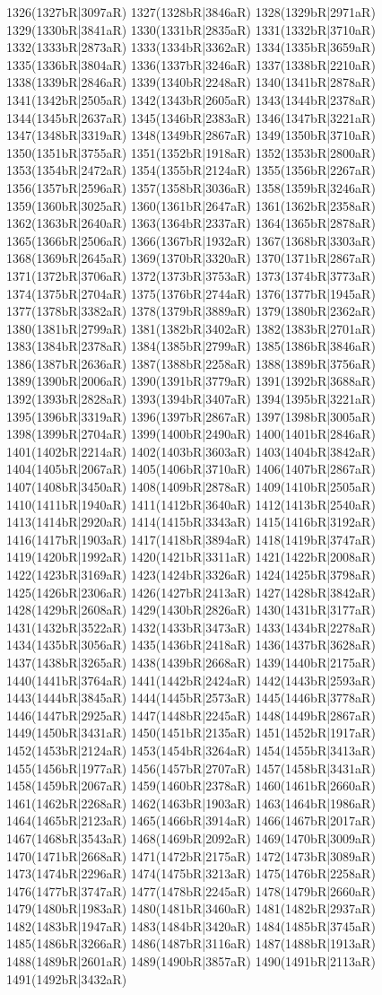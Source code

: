 1326(1327bR|3097aR) 1327(1328bR|3846aR) 1328(1329bR|2971aR) 1329(1330bR|3841aR) 1330(1331bR|2835aR) 1331(1332bR|3710aR) 1332(1333bR|2873aR) 1333(1334bR|3362aR) 1334(1335bR|3659aR) 1335(1336bR|3804aR) 1336(1337bR|3246aR) 1337(1338bR|2210aR) 1338(1339bR|2846aR) 1339(1340bR|2248aR) 1340(1341bR|2878aR) 1341(1342bR|2505aR) 1342(1343bR|2605aR) 1343(1344bR|2378aR) 1344(1345bR|2637aR) 1345(1346bR|2383aR) 1346(1347bR|3221aR) 1347(1348bR|3319aR) 1348(1349bR|2867aR) 1349(1350bR|3710aR) 1350(1351bR|3755aR) 1351(1352bR|1918aR) 1352(1353bR|2800aR) 1353(1354bR|2472aR) 1354(1355bR|2124aR) 1355(1356bR|2267aR) 1356(1357bR|2596aR) 1357(1358bR|3036aR) 1358(1359bR|3246aR) 1359(1360bR|3025aR) 1360(1361bR|2647aR) 1361(1362bR|2358aR) 1362(1363bR|2640aR) 1363(1364bR|2337aR) 1364(1365bR|2878aR) 1365(1366bR|2506aR) 1366(1367bR|1932aR) 1367(1368bR|3303aR) 1368(1369bR|2645aR) 1369(1370bR|3320aR) 1370(1371bR|2867aR) 1371(1372bR|3706aR) 1372(1373bR|3753aR) 1373(1374bR|3773aR) 1374(1375bR|2704aR) 1375(1376bR|2744aR) 1376(1377bR|1945aR) 1377(1378bR|3382aR) 1378(1379bR|3889aR) 1379(1380bR|2362aR) 1380(1381bR|2799aR) 1381(1382bR|3402aR) 1382(1383bR|2701aR) 1383(1384bR|2378aR) 1384(1385bR|2799aR) 1385(1386bR|3846aR) 1386(1387bR|2636aR) 1387(1388bR|2258aR) 1388(1389bR|3756aR) 1389(1390bR|2006aR) 1390(1391bR|3779aR) 1391(1392bR|3688aR) 1392(1393bR|2828aR) 1393(1394bR|3407aR) 1394(1395bR|3221aR) 1395(1396bR|3319aR) 1396(1397bR|2867aR) 1397(1398bR|3005aR) 1398(1399bR|2704aR) 1399(1400bR|2490aR) 1400(1401bR|2846aR) 1401(1402bR|2214aR) 1402(1403bR|3603aR) 1403(1404bR|3842aR) 1404(1405bR|2067aR) 1405(1406bR|3710aR) 1406(1407bR|2867aR) 1407(1408bR|3450aR) 1408(1409bR|2878aR) 1409(1410bR|2505aR) 1410(1411bR|1940aR) 1411(1412bR|3640aR) 1412(1413bR|2540aR) 1413(1414bR|2920aR) 1414(1415bR|3343aR) 1415(1416bR|3192aR) 1416(1417bR|1903aR) 1417(1418bR|3894aR) 1418(1419bR|3747aR) 1419(1420bR|1992aR) 1420(1421bR|3311aR) 1421(1422bR|2008aR) 1422(1423bR|3169aR) 1423(1424bR|3326aR) 1424(1425bR|3798aR) 1425(1426bR|2306aR) 1426(1427bR|2413aR) 1427(1428bR|3842aR) 1428(1429bR|2608aR) 1429(1430bR|2826aR) 1430(1431bR|3177aR) 1431(1432bR|3522aR) 1432(1433bR|3473aR) 1433(1434bR|2278aR) 1434(1435bR|3056aR) 1435(1436bR|2418aR) 1436(1437bR|3628aR) 1437(1438bR|3265aR) 1438(1439bR|2668aR) 1439(1440bR|2175aR) 1440(1441bR|3764aR) 1441(1442bR|2424aR) 1442(1443bR|2593aR) 1443(1444bR|3845aR) 1444(1445bR|2573aR) 1445(1446bR|3778aR) 1446(1447bR|2925aR) 1447(1448bR|2245aR) 1448(1449bR|2867aR) 1449(1450bR|3431aR) 1450(1451bR|2135aR) 1451(1452bR|1917aR) 1452(1453bR|2124aR) 1453(1454bR|3264aR) 1454(1455bR|3413aR) 1455(1456bR|1977aR) 1456(1457bR|2707aR) 1457(1458bR|3431aR) 1458(1459bR|2067aR) 1459(1460bR|2378aR) 1460(1461bR|2660aR) 1461(1462bR|2268aR) 1462(1463bR|1903aR) 1463(1464bR|1986aR) 1464(1465bR|2123aR) 1465(1466bR|3914aR) 1466(1467bR|2017aR) 1467(1468bR|3543aR) 1468(1469bR|2092aR) 1469(1470bR|3009aR) 1470(1471bR|2668aR) 1471(1472bR|2175aR) 1472(1473bR|3089aR) 1473(1474bR|2296aR) 1474(1475bR|3213aR) 1475(1476bR|2258aR) 1476(1477bR|3747aR) 1477(1478bR|2245aR) 1478(1479bR|2660aR) 1479(1480bR|1983aR) 1480(1481bR|3460aR) 1481(1482bR|2937aR) 1482(1483bR|1947aR) 1483(1484bR|3420aR) 1484(1485bR|3745aR) 1485(1486bR|3266aR) 1486(1487bR|3116aR) 1487(1488bR|1913aR) 1488(1489bR|2601aR) 1489(1490bR|3857aR) 1490(1491bR|2113aR) 1491(1492bR|3432aR) 
